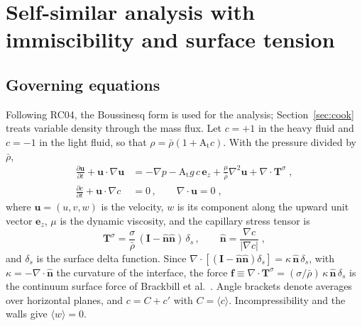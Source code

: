\documentclass[11pt]{article}
\numberwithin{equation}{section}
\newcommand{\avg}[1]{\langle #1\rangle}
\newcommand{\At}{\mathrm{A_t}}
\newcommand{\pd}[2]{\frac{\partial #1}{\partial #2}}
\begin{document}
\section{Self-similar analysis with immiscibility and surface tension}\label{sec:rc}

\subsection{Governing equations}\label{sec:rc:eqs}
Following RC04, the Boussinesq form is used for the analysis; Section~\ref{sec:cook} treats variable density through the mass flux. Let $c = +1$ in the heavy fluid and $c = -1$ in the light fluid, so that $\rho = \bar\rho(1 + \At c)$. With the pressure divided by $\bar\rho$,
\begin{align}
\pd{\mathbf u}{t} + \mathbf u \cdot \nabla \mathbf u & = -\nabla p - \At g \, c \, \mathbf e_z + \frac{\mu}{\bar\rho} \nabla^2 \mathbf u
+ \nabla \cdot \mathbf T^\sigma \;,
\label{eq:mom} \\
\pd{c}{t} + \mathbf u \cdot \nabla c & = 0 \, , \qquad \nabla \cdot \mathbf u = 0 \;, \label{eq:indicator}
\end{align}
where $\mathbf u = (u, v, w)$ is the velocity, $w$ is its component along the upward unit vector $\mathbf e_z$, $\mu$ is the dynamic viscosity, and the capillary stress tensor is \cite{Lafaurie1994}
\begin{equation}\label{eq:Tsigma}
\mathbf T^\sigma = \frac{\sigma}{\bar\rho} \,(\mathbf I - \hat{\mathbf n} \hat{\mathbf n}) \, \delta_s \, , \qquad
\hat{\mathbf n} = \frac{\nabla c}{| \nabla c |} \;,
\end{equation}
and $\delta_s$ is the surface delta function. Since $\nabla \cdot [(\mathbf I - \hat{\mathbf n} \hat{\mathbf n}) \delta_s] = \kappa \, \hat{\mathbf n} \, \delta_s$, with $\kappa = -\nabla \cdot \hat{\mathbf n}$ the curvature of the interface, the force $\mathbf f \equiv \nabla \cdot \mathbf T^\sigma = (\sigma/\bar\rho) \, \kappa \, \hat{\mathbf n} \, \delta_s$ is the continuum surface force of Brackbill et al.\ \cite{Brackbill1992}. Angle brackets denote averages over horizontal planes, and $c = C + c'$ with $C = \avg c$. Incompressibility and the walls give $\avg w = 0$.
\end{document}
